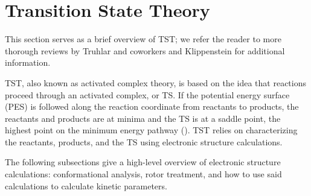 \documentclass[preprint, 11pt]{elsarticle} %
\begin{document}

\section{Transition State Theory}



This section serves as a brief overview of TST; we refer the reader to more thorough reviews by Truhlar and coworkers \cite{truhlar:1996} and Klippenstein \cite{Klippenstein:2017eu} for additional information.

TST, also known as activated complex theory, is based on the idea that reactions proceed through an activated complex, or TS.
If the potential energy surface (PES) is followed along the reaction coordinate from reactants to products, the reactants and products are at minima and the TS is at a saddle point, the highest point on the minimum energy pathway (). 
TST relies on characterizing the reactants, products, and the TS using electronic structure calculations.

The following subsections give a high-level overview of electronic structure calculations: conformational analysis, rotor treatment, and how to use said calculations to calculate kinetic parameters.
\end{document}
